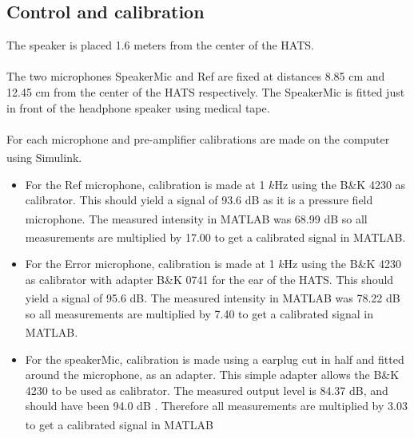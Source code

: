 \subsection{Control and calibration}
The speaker is placed 1.6 meters from the center of the HATS. \\\\
The two microphones SpeakerMic and Ref are fixed at distances 8.85 cm and 12.45 cm from the center of the HATS respectively. The SpeakerMic is fitted just in front of the headphone speaker using medical tape.\\\\
For each microphone and pre-amplifier calibrations are made on the computer using Simulink\textsuperscript{\textregistered}.
\begin{itemize}
	\item For the Ref microphone, calibration is made at 1 $k$Hz using the B\&K 4230 as calibrator. This should yield a signal of 93.6 dB as it is a pressure field microphone. The measured intensity in MATLAB\textsuperscript{\textregistered} was 68.99 dB so all measurements are multiplied by 17.00 to get a calibrated signal in MATLAB\textsuperscript{\textregistered}. 
	\item For the Error microphone, calibration is made at 1 $k$Hz using the B\&K 4230 as calibrator with adapter B\&K 0741 for the ear of the HATS. This should yield a signal of 95.6 dB. The measured intensity in MATLAB\textsuperscript{\textregistered} was 78.22 dB so all measurements are multiplied by 7.40 to get a calibrated signal in MATLAB\textsuperscript{\textregistered}. 
	\item For the speakerMic, calibration is made using a earplug cut in half and fitted around the microphone, as an adapter. This simple adapter allows the B\&K 4230 to be used as calibrator. The measured output level is 84.37 dB, and should have been 94.0 dB . Therefore all measurements are multiplied by 3.03 to get a calibrated signal in MATLAB\textsuperscript{\textregistered}
\end{itemize}
 
